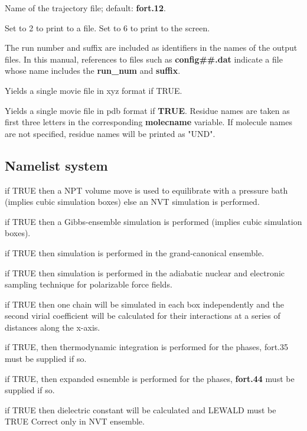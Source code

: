 \documentclass[12pt,letterpaper]{article}
\begin{document}
 Name of the trajectory file;
default: \textbf{fort.12}.

 Set to 2 to print to a file. Set
to 6 to print to the screen.

 The run number and suffix
are included as identifiers in the names of the output
files. In this manual, references to files such as {\bf
  config\#\#.dat} indicate a file whose name includes the
{\bf run\_num} and {\bf suffix}.

 Yields a single movie file in
xyz format if TRUE.

 Yields a single movie file in
pdb format if \textbf{TRUE}. Residue names are taken as first three
letters in the corresponding {\bf molecname} variable. If
molecule names are not specified, residue names will be
printed as "UND".

\subsection{Namelist \textbf{system}}
 if TRUE then a NPT volume move is used
to equilibrate with a pressure bath (implies cubic
simulation boxes) else an NVT simulation is performed.

 if TRUE then a Gibbs-ensemble
simulation is performed (implies cubic simulation boxes).

 if TRUE then simulation is performed
in the grand-canonical ensemble.

 if TRUE then simulation is performed in
the adiabatic nuclear and electronic sampling technique for
polarizable force fields.

 if TRUE then one chain will be
simulated in each box independently and the second virial
coefficient will be calculated for their interactions at a
series of distances along the x-axis.

 if TRUE, then thermodynamic
integration is performed for the phases, fort.35 must be
supplied if so.

 if TRUE, then expanded esnemble is
performed for the phases, {\bf fort.44} must be supplied if
so.

 if TRUE then dielectric constant
will be calculated and LEWALD must be TRUE Correct only in
NVT ensemble.
\end{document}
